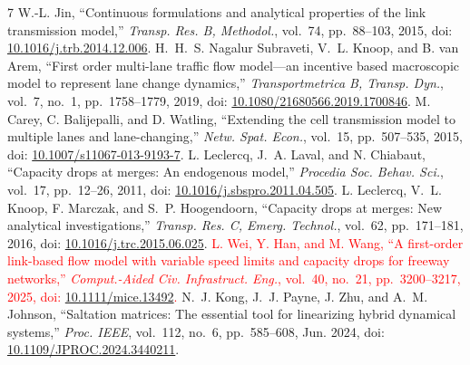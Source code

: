 \documentclass[10pt,a4paper]{article}
\newcommand{\rev}[1]{\textcolor{red}{#1}}
\begin{document}
\begin{thebibliography}{7}
\setlength{\itemsep}{0pt}\setlength{\parskip}{0pt}
 W.-L. Jin, ``Continuous formulations and analytical properties
of the link transmission model,'' \emph{Transp. Res. B, Methodol.}, vol.~74,
pp.~88--103, 2015, doi: \href{https://doi.org/10.1016/j.trb.2014.12.006}{10.1016/j.trb.2014.12.006}.
 H.~H.~S. Nagalur Subraveti, V.~L. Knoop, and B. van Arem,
``First order multi-lane traffic flow model---an incentive based macroscopic
model to represent lane change dynamics,'' \emph{Transportmetrica B, Transp.
Dyn.}, vol.~7, no.~1, pp.~1758--1779, 2019, doi:
\href{https://doi.org/10.1080/21680566.2019.1700846}{10.1080/21680566.2019.1700846}.
 M. Carey, C. Balijepalli, and D. Watling, ``Extending the cell
transmission model to multiple lanes and lane-changing,'' \emph{Netw. Spat.
Econ.}, vol.~15, pp.~507--535, 2015, doi:
\href{https://doi.org/10.1007/s11067-013-9193-7}{10.1007/s11067-013-9193-7}.
 L. Leclercq, J.~A. Laval, and N. Chiabaut,
``Capacity drops at merges: An endogenous model,'' \emph{Procedia Soc.
Behav. Sci.}, vol.~17, pp.~12--26, 2011, doi:
\href{https://doi.org/10.1016/j.sbspro.2011.04.505}{10.1016/j.sbspro.2011.04.505}.
 L. Leclercq, V.~L. Knoop, F. Marczak, and S.~P. Hoogendoorn,
``Capacity drops at merges: New analytical investigations,'' \emph{Transp.
Res. C, Emerg. Technol.}, vol.~62, pp.~171--181, 2016, doi:
\href{https://doi.org/10.1016/j.trc.2015.06.025}{10.1016/j.trc.2015.06.025}.
 \rev{L. Wei, Y. Han, and M. Wang, ``A first-order link-based flow
model with variable speed limits and capacity drops for freeway networks,''
\emph{Comput.-Aided Civ. Infrastruct. Eng.}, vol.~40, no.~21,
pp.~3200--3217, 2025, doi:
\href{https://doi.org/10.1111/mice.13492}{10.1111/mice.13492}.}
 N.~J. Kong, J.~J. Payne, J. Zhu, and A.~M. Johnson,
``Saltation matrices: The essential tool for linearizing hybrid dynamical
systems,'' \emph{Proc. IEEE}, vol.~112, no.~6, pp.~585--608, Jun. 2024, doi:
\href{https://doi.org/10.1109/JPROC.2024.3440211}{10.1109/JPROC.2024.3440211}.
\end{thebibliography}
\end{document}
